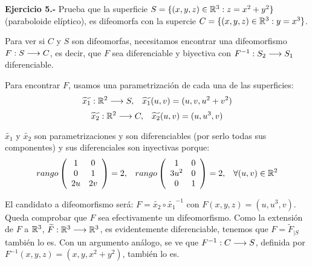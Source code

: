 \documentclass[12pt]{article}
\begin{document}
\textbf{Ejercicio 5.-} Prueba que la superficie $S=\{(x,y,z)\in\mathbb{R}^3:z=x^2+y^2\}$ (paraboloide elíptico), es difeomorfa con la supercie $C=\{(x,y,z)\in\mathbb{R}^3:y=x^3\}$.

\medskip\medskip

Para ver si $C$ y $S$ son difeomorfas, necesitamos encontrar una difeomorfismo $F : S \longrightarrow C$, es decir, que $F$ sea diferenciable y biyectiva con $F^ {-1} : S_2 \longrightarrow S_1$ diferenciable.


Para encontrar $F$, usamos una parametrización de cada una de las superficies:
\[
\widetilde{x_1} : \mathbb{R}^2 \longrightarrow S, \;\;\; \widetilde{x_1}(u,v)=(u,v,u^2+v^2) 
\]
\[
\widetilde{x_2} : \mathbb{R}^2 \longrightarrow C, \;\;\; \widetilde{x_2}(u,v)=(u,u^3,v) 
\]

$\widetilde{x_1}$ y $\widetilde{x_2}$ son parametrizaciones y son diferenciables (por serlo todas sus componentes) y sus diferenciales son inyectivas porque:
\[
rango\left(
\begin{array}{cc}
1 & 0\\
0 & 1\\
2u & 2v
\end{array}
\right)=2,
\;\;\; rango\left(
\begin{array}{cc}
1 & 0\\
3u^2 & 0\\
0 & 1
\end{array}
\right)=2, \;\;\; \forall (u,v)\in\mathbb{R}^2
\]


El candidato a difeomorfismo será: $F=\widetilde{x_2}\circ\widetilde{x_1}^{-1}$ con $F(x,y,z)=(u,u^3,v)$. Queda comprobar que $F$ sea efectivamente un difeomorfismo. Como la extensión de $F$ a $\mathbb{R}^3$, $\widetilde{F} : \mathbb{R}^3 \longrightarrow \mathbb{R}^3$, es evidentemente diferenciable, tenemos que $F=\widetilde{F}_{|S}$ también lo es. Con un argumento análogo, se ve que $F^{-1} : C \longrightarrow S$, definida por $F^{-1}(x,y,z)=(x,y,x^2+y^2)$, también lo es.
\end{document}
